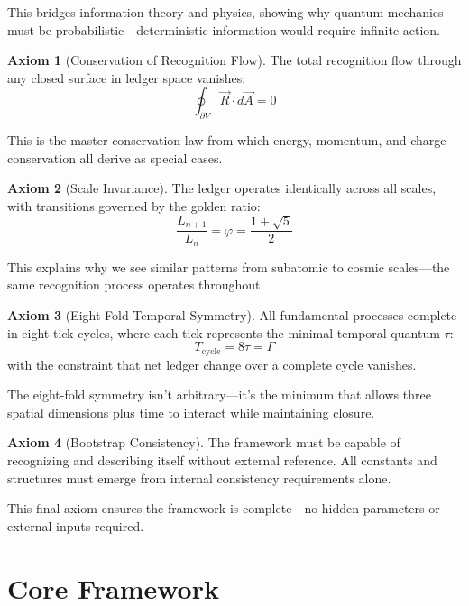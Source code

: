 \documentclass[12pt,a4paper]{article}
\newcommand{\tick}{\tau}
\newcommand{\chronon}{\Gamma}
\newcommand{\golden}{\varphi}
\theoremstyle{definition}
\newtheorem{axiom}{Axiom}
\begin{document}
This bridges information theory and physics, showing why quantum mechanics must be probabilistic—deterministic information would require infinite action.

\begin{axiom}[Conservation of Recognition Flow]
The total recognition flow through any closed surface in ledger space vanishes:
\begin{equation}
    \oint_{\partial V} \vec{R} \cdot d\vec{A} = 0
\end{equation}
\end{axiom}

This is the master conservation law from which energy, momentum, and charge conservation all derive as special cases.

\begin{axiom}[Scale Invariance]
The ledger operates identically across all scales, with transitions governed by the golden ratio:
\begin{equation}
    \frac{L_{n+1}}{L_n} = \golden = \frac{1 + \sqrt{5}}{2}
\end{equation}
\end{axiom}

This explains why we see similar patterns from subatomic to cosmic scales—the same recognition process operates throughout.

\begin{axiom}[Eight-Fold Temporal Symmetry]
All fundamental processes complete in eight-tick cycles, where each tick represents the minimal temporal quantum $\tick$:
\begin{equation}
    T_{\text{cycle}} = 8\tick = \chronon
\end{equation}
with the constraint that net ledger change over a complete cycle vanishes.
\end{axiom}

The eight-fold symmetry isn't arbitrary—it's the minimum that allows three spatial dimensions plus time to interact while maintaining closure.

\begin{axiom}[Bootstrap Consistency]
The framework must be capable of recognizing and describing itself without external reference. All constants and structures must emerge from internal consistency requirements alone.
\end{axiom}

This final axiom ensures the framework is complete—no hidden parameters or external inputs required.

\section{Core Framework}
\end{document}
